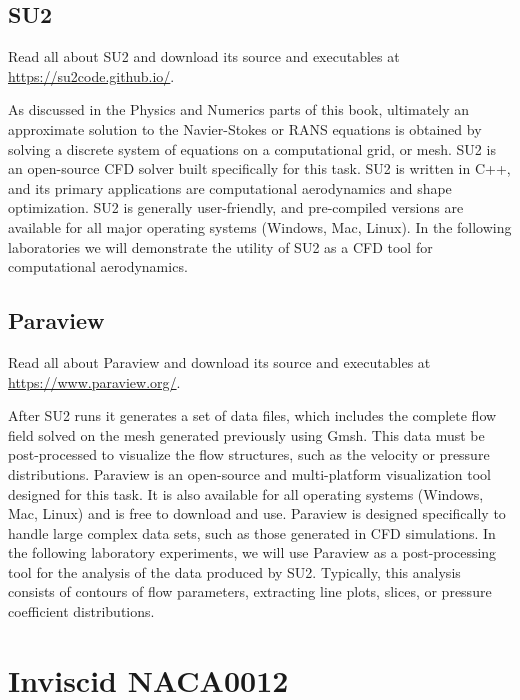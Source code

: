 \section{SU2}
\begin{su2note}
	Read all about SU2 and download its source and executables at \href{https://su2code.github.io/}{https://su2code.github.io/}.
\end{su2note}
As discussed in the Physics and Numerics parts of this book, ultimately an approximate solution to the Navier-Stokes or RANS equations is obtained by solving a discrete system of equations on a computational grid, or mesh. SU2 is an open-source CFD solver built specifically for this task. SU2 is written in C++, and its primary applications are computational aerodynamics and shape optimization. SU2 is generally user-friendly, and pre-compiled versions are available for all major operating systems (Windows, Mac, Linux). In the following laboratories we will demonstrate the utility of SU2 as a CFD tool for computational aerodynamics.

\section{Paraview}
\begin{paraviewnote}
	Read all about Paraview and download its source and executables at \href{https://www.paraview.org/}{https://www.paraview.org/}.
\end{paraviewnote}
After SU2 runs it generates a set of data files, which includes the complete flow field solved on the mesh generated previously using Gmsh. This data must be post-processed to visualize the flow structures, such as the velocity or pressure distributions. Paraview is an open-source and multi-platform visualization tool designed for this task. It is also available for all operating systems (Windows, Mac, Linux) and is free to download and use. Paraview is designed specifically to handle large complex data sets, such as those generated in CFD simulations. In the following laboratory experiments, we will use Paraview as a post-processing tool for the analysis of the data produced by SU2. Typically, this analysis consists of contours of flow parameters, extracting line plots, slices, or pressure coefficient distributions.

\chapter{Inviscid NACA0012}
\label{ch:Inviscid NACA0012}
